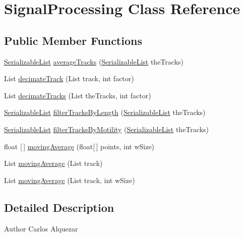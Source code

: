 \hypertarget{classfunctions_1_1_signal_processing}{}\section{Signal\+Processing Class Reference}
\label{classfunctions_1_1_signal_processing}
\subsection*{Public Member Functions}
\begin{DoxyCompactItemize}
\item 
\hyperlink{classdata_1_1_serializable_list}{Serializable\+List} \hyperlink{classfunctions_1_1_signal_processing_abf1074d52caa632088bc9c8f12f8ee53}{average\+Tracks} (\hyperlink{classdata_1_1_serializable_list}{Serializable\+List} the\+Tracks)
\item 
List \hyperlink{classfunctions_1_1_signal_processing_ab5068ef8536594355df9d576ba97dd57}{decimate\+Track} (List track, int factor)
\item 
List \hyperlink{classfunctions_1_1_signal_processing_a3681b0de9ff6ff95edd91bab486627e5}{decimate\+Tracks} (List the\+Tracks, int factor)
\item 
\hyperlink{classdata_1_1_serializable_list}{Serializable\+List} \hyperlink{classfunctions_1_1_signal_processing_a032b1dff0d4763927928158714db911f}{filter\+Tracks\+By\+Length} (\hyperlink{classdata_1_1_serializable_list}{Serializable\+List} the\+Tracks)
\item 
\hyperlink{classdata_1_1_serializable_list}{Serializable\+List} \hyperlink{classfunctions_1_1_signal_processing_a7302e4cf91bc23463aa9354325d2993d}{filter\+Tracks\+By\+Motility} (\hyperlink{classdata_1_1_serializable_list}{Serializable\+List} the\+Tracks)
\item 
float \mbox{[}$\,$\mbox{]} \hyperlink{classfunctions_1_1_signal_processing_a4f10245c50d850b87d1ef4d81c28300d}{moving\+Average} (float\mbox{[}$\,$\mbox{]} points, int w\+Size)
\item 
List \hyperlink{classfunctions_1_1_signal_processing_a9f9e525d2a03a62026159736e71a2343}{moving\+Average} (List track)
\item 
List \hyperlink{classfunctions_1_1_signal_processing_a9dbd7166c87ffab7dc6d7f7435e89f95}{moving\+Average} (List track, int w\+Size)
\end{DoxyCompactItemize}


\subsection{Detailed Description}
\begin{DoxyAuthor}{Author}
Carlos Alquezar 
\end{DoxyAuthor}


